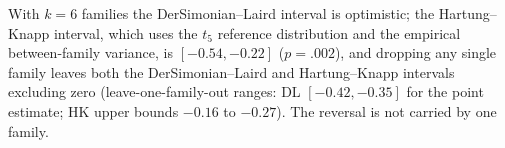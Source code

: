 With $k=6$ families the DerSimonian--Laird interval is optimistic; the Hartung--Knapp interval, which uses the $t_{5}$ reference distribution and the empirical between-family variance, is $[-0.54,-0.22]$ ($p=.002$), and dropping any single family leaves both the DerSimonian--Laird and Hartung--Knapp intervals excluding zero (leave-one-family-out ranges: DL $[-0.42,-0.35]$ for the point estimate; HK upper bounds $-0.16$ to $-0.27$). The reversal is not carried by one family.
